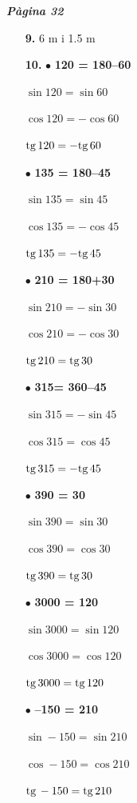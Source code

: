 \documentclass[a4paper, pdf, twoside]{book}
\begin{document}
\begin{multicols}{2}

{\textbf{\em Pàgina 32}} \hrulefill
\begin{enumerate}
\vspace{0.25cm}
\item[\fontfamily{phv}\selectfont\color{blue}\textbf{9. }] 
6 m i 1.5 m
 \end{enumerate}
\begin{enumerate}
\vspace{0.25cm}
\item[\fontfamily{phv}\selectfont\color{blue}\textbf{10. }] 
 $\bullet $ \textbf {120 = 180--60} \par \par $\sin 120=\sin 60$\par $\cos 120=-\cos 60$\par $\mathrm{tg}\, 120=-\mathrm{tg}\, 60$\par \par $\bullet $ \textbf {135 = 180--45} \par \par $\sin 135=\sin 45$\par $\cos 135=-\cos 45$\par $\mathrm{tg}\, 135=-\mathrm{tg}\, 45$\par \par $\bullet $ \textbf {210 = 180+30} \par \par $\sin 210=-\sin 30$\par $\cos 210=-\cos 30$\par $\mathrm{tg}\, 210=\mathrm{tg}\, 30$\par \par $\bullet $ \textbf {315= 360--45} \par \par $\sin 315=-\sin 45$\par $\cos 315=\cos 45$\par $\mathrm{tg}\, 315=-\mathrm{tg}\, 45$\par \par $\bullet $ \textbf {390 = 30} \par \par $\sin 390=\sin 30$\par $\cos 390=\cos 30$\par $\mathrm{tg}\, 390=\mathrm{tg}\, 30$\par \par $\bullet $ \textbf {3000 = 120} \par \par $\sin 3000=\sin 120$\par $\cos 3000=\cos 120$\par $\mathrm{tg}\, 3000=\mathrm{tg}\, 120$\par \par $\bullet $ \textbf {--150 = 210} \par \par $\sin -150=\sin 210$\par $\cos -150=\cos 210$\par $\mathrm{tg}\, -150=\mathrm{tg}\, 210$\par \par 
 \end{enumerate}
\vspace{0.3cm}


\end{multicols}
\end{document}
